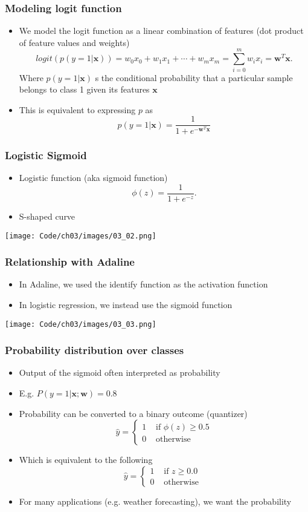\documentclass{beamer}
\begin{document}
\begin{frame}
  \frametitle{Modeling logit function}
  \begin{itemize}
  \item We model the logit function as a linear combination of features (dot product of feature values and weights)
    \[
    logit ( p (y=1 | \mathbf{x})) = w_0 x_0 + w_1 x_1 + \cdots + w_m x_m = \sum^{m}_{i=0} w_i x_i = \mathbf{w}^T \mathbf{x}.
    \]
    Where $p(y=1 | \mathbf{x})$ s the conditional probability that a particular sample belongs to class 1 given its features $\mathbf{x}$
  \item This is equivalent to expressing $p$ as
    \[
    p(y = 1 | \mathbf{x}) = \frac{1}{1 + e^{-\mathbf{w}^T \mathbf{x}}}
    \]
  \end{itemize}
\end{frame}

\begin{frame}
  \frametitle{Logistic Sigmoid}
  \begin{itemize}
  \item Logistic function (aka sigmoid function)
    \[
    \phi(z) = \frac{1}{1+e^{-z}}.
    \]
  \item S-shaped curve
  \end{itemize}
  \center
  \texttt{[image: Code/ch03/images/03\_02.png]}
\end{frame}

\begin{frame}
  \frametitle{Relationship with Adaline}
  \begin{itemize}
  \item In Adaline, we used the identify function as the activation function
  \item In logistic regression, we instead use the sigmoid function
  \end{itemize}
  \texttt{[image: Code/ch03/images/03\_03.png]}
\end{frame}

\begin{frame}
  \frametitle{Probability distribution over classes}
  \begin{itemize}
  \item Output of the sigmoid often interpreted as probability
  \item E.g. $P(y=1 | \mathbf{x};\mathbf{w}) = 0.8$
  \item Probability can be converted to a binary outcome (quantizer)
  \[ \hat{y}= \begin{cases}
    1 & \text{ if } \phi(z) \ge 0.5 \\
    0 & \text{ otherwise }
    \end{cases}
  \]
\item Which is equivalent to the following
  \[ \hat{y}= \begin{cases}
    1 & \text{ if } z \ge 0.0 \\
    0 & \text{ otherwise }
    \end{cases}
  \]
  \item For many applications (e.g. weather forecasting), we want the probability
  \end{itemize}
\end{frame}
\end{document}

